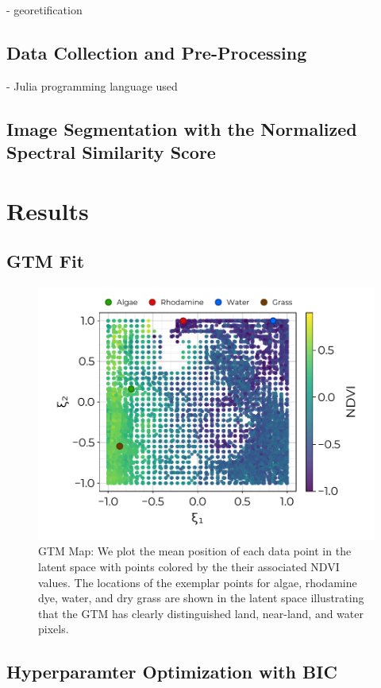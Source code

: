 \documentclass[remotesensing,article,submit,pdftex,moreauthors]{Definitions/mdpi}
\begin{document}
- georetification \cite{muller2002program, baumker2001new, mostafa2000multi}

\subsection{Data Collection and Pre-Processing}
- Julia programming language used \cite{bezanson2012julia}



\subsection{Image Segmentation with the Normalized Spectral Similarity Score}


\section{Results}

\subsection{GTM Fit}

\begin{figure}[t]
\centering
\includegraphics[width=0.8\columnwidth]{paper/figures/results/square-ndvi.pdf}
\caption{GTM Map: We plot the mean position of each data point in the latent space with points colored by the their associated NDVI values. The locations of the exemplar points for algae, rhodamine dye, water, and dry grass are shown in the latent space illustrating that the GTM has clearly distinguished land, near-land, and water pixels.\label{fig:}}
\end{figure}  


\subsection{Hyperparamter Optimization with BIC}
\end{document}
